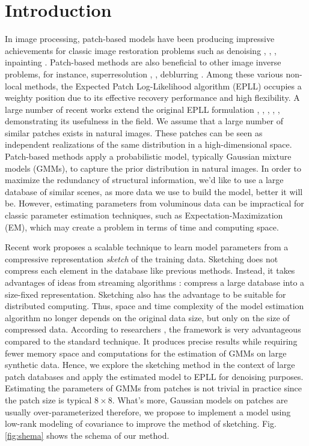 \documentclass[12pt,a4paper]{article}
\begin{document}
\section{Introduction}
In image processing, patch-based models have been producing impressive achievements for classic image restoration problems such as denoising \cite{Buades05areview}, \cite{Lebrun2013ANB}, \cite{wang2013sure}, inpainting \cite{Criminisi2004RegionFA}.
Patch-based methods are also beneficial to other image inverse problems, for instance, superresolution \cite{7080709}, \cite{Glasner2009SuperresolutionFA}, deblurring \cite{Katkovnik2009NonlocalID}. Among these various non-local methods, the Expected Patch Log-Likelihood algorithm (EPLL) \cite{Zoran} occupies a weighty position due to its effective recovery performance and high flexibility.
A large number of recent works extend the original  EPLL formulation \cite{houdard:hal-01544249}, \cite{parameswaran:hal-01617722}, \cite{Sulam2014ExpectedPL}, \cite{Papyan2016MultiScalePI}, \cite{deledalle:hal-01700082}, demonstrating its usefulness in the field.
We assume that a large number of similar patches exists in natural images. These patches can be seen as independent realizations of the same distribution in a high-dimensional space. Patch-based methods apply a probabilistic model, typically Gaussian mixture models (GMMs), to capture the prior distribution in natural images.
In order to maximize the redundancy of structural information, we'd like to use a large database of similar scenes, as more data we use to build the model, better it will be.
However, estimating parameters from voluminous data can be impractical for classic parameter estimation techniques, such as Expectation\hyp{}Maximization (EM), which may create a problem in terms of time and computing space. 

Recent work \cite{keriven:hal-01329195} proposes a scalable technique to learn model parameters from a compressive representation \textit{sketch} of the training data.
Sketching does not compress each element in the database like previous methods.
Instead, it takes advantages of ideas from streaming algorithms \cite{Cormode2004AnID}: compress a large database into a size-fixed representation.
Sketching also has the advantage to be suitable for distributed computing.
Thus, space and time complexity of the model estimation algorithm no longer depends on the original data size, but only on the size of compressed data.
According to researchers \cite{keriven:hal-01329195}, the  framework is very advantageous compared to the standard technique.
It produces precise results while requiring fewer memory space and computations for the estimation of GMMs on large synthetic data.
Hence, we explore the sketching method in the context of large patch databases and apply the estimated model to EPLL for denoising purposes.
Estimating the parameters of GMMs from patches is not trivial in practice since the patch size is typical $8 \times 8$.
What's more, Gaussian models on patches are usually over-parameterized therefore, we propose to implement a model using low-rank modeling of covariance to improve the method of sketching. Fig. \ref{fig:shema} shows the schema of our method.
\end{document}
